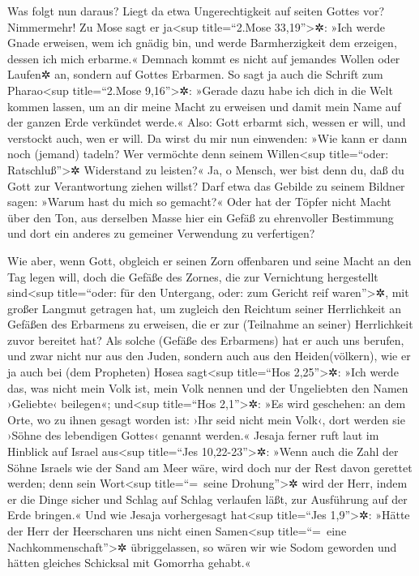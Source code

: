  Was folgt nun daraus? Liegt da etwa Ungerechtigkeit auf
seiten Gottes vor? Nimmermehr!  Zu Mose sagt er
ja\textless sup title=``2.Mose 33,19''\textgreater✲: »Ich werde Gnade
erweisen, wem ich gnädig bin, und werde Barmherzigkeit dem erzeigen,
dessen ich mich erbarme.«  Demnach kommt es nicht auf
jemandes Wollen oder Laufen✲ an, sondern auf Gottes Erbarmen.
 So sagt ja auch die Schrift zum Pharao\textless sup
title=``2.Mose 9,16''\textgreater✲: »Gerade dazu habe ich dich in die
Welt kommen lassen, um an dir meine Macht zu erweisen und damit mein
Name auf der ganzen Erde verkündet werde.«  Also: Gott
erbarmt sich, wessen er will, und verstockt auch, wen er will.
 Da wirst du mir nun einwenden: »Wie kann er dann noch
(jemand) tadeln? Wer vermöchte denn seinem Willen\textless sup
title=``oder: Ratschluß''\textgreater✲ Widerstand zu leisten?«
 Ja, o Mensch, wer bist denn du, daß du Gott zur
Verantwortung ziehen willst? Darf etwa das Gebilde zu seinem Bildner
sagen: »Warum hast du mich so gemacht?«  Oder hat der
Töpfer nicht Macht über den Ton, aus derselben Masse hier ein Gefäß zu
ehrenvoller Bestimmung und dort ein anderes zu gemeiner Verwendung zu
verfertigen?

 Wie aber, wenn Gott, obgleich er seinen Zorn offenbaren
und seine Macht an den Tag legen will, doch die Gefäße des Zornes, die
zur Vernichtung hergestellt sind\textless sup title=``oder: für den
Untergang, oder: zum Gericht reif waren''\textgreater✲, mit großer
Langmut getragen hat,  um zugleich den Reichtum seiner
Herrlichkeit an Gefäßen des Erbarmens zu erweisen, die er zur (Teilnahme
an seiner) Herrlichkeit zuvor bereitet hat?  Als solche
(Gefäße des Erbarmens) hat er auch uns berufen, und zwar nicht nur aus
den Juden, sondern auch aus den Heiden(völkern),  wie er
ja auch bei (dem Propheten) Hosea sagt\textless sup title=``Hos
2,25''\textgreater✲: »Ich werde das, was nicht mein Volk ist, mein Volk
nennen und der Ungeliebten den Namen ›Geliebte‹ beilegen«;
 und\textless sup title=``Hos 2,1''\textgreater✲: »Es
wird geschehen: an dem Orte, wo zu ihnen gesagt worden ist: ›Ihr seid
nicht mein Volk‹, dort werden sie ›Söhne des lebendigen Gottes‹ genannt
werden.«  Jesaja ferner ruft laut im Hinblick auf Israel
aus\textless sup title=``Jes 10,22-23''\textgreater✲: »Wenn auch die
Zahl der Söhne Israels wie der Sand am Meer wäre, wird doch nur der Rest
davon gerettet werden;  denn sein Wort\textless sup
title=``=~seine Drohung''\textgreater✲ wird der Herr, indem er die Dinge
sicher und Schlag auf Schlag verlaufen läßt, zur Ausführung auf der Erde
bringen.«  Und wie Jesaja vorhergesagt hat\textless sup
title=``Jes 1,9''\textgreater✲: »Hätte der Herr der Heerscharen uns
nicht einen Samen\textless sup title=``=~eine
Nachkommenschaft''\textgreater✲ übriggelassen, so wären wir wie Sodom
geworden und hätten gleiches Schicksal mit Gomorrha gehabt.«

